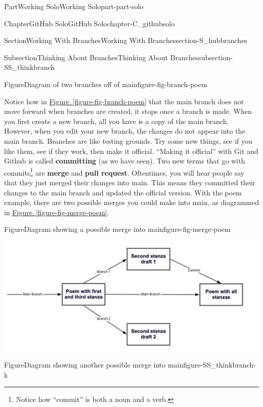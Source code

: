 \documentclass[oneside,10pt,]{book}
\newcommand{\xreffont}{\relax}
\newcommand{\terminology}[1]{\textbf{#1}}
\begin{document}
\begin{partptx}{Part}{Working Solo}{}{Working Solo}{}{}{part-part-solo}
\begin{chapterptx}{Chapter}{GitHub Solo}{}{GitHub Solo}{}{}{chapter-C_githubsolo}
\begin{sectionptx}{Section}{Working With Branches}{}{Working With Branches}{}{}{section-S_hubbranches}
\begin{subsectionptx}{Subsection}{Thinking About Branches}{}{Thinking About Branches}{}{}{subsection-SS_thinkbranch}
\begin{figureptx}{Figure}{Diagram of two branches off of main}{figure-fig-branch-poem}{}
\begin{image}{0}{1}{0}{}
\end{image}%
\tcblower
\end{figureptx}%
 Notice how in \hyperref[figure-fig-branch-poem]{Figure~{\xreffont\ref{figure-fig-branch-poem}}} that the main branch does not move forward when branches are created, it stops once a branch is made. When you first create a new branch, all you have is a copy of the main branch. However, when you edit your new branch, the changes do not appear into the main branch. Branches are like testing grounds. Try some new things, see if you like them, see if they work, then make it official. ``Making it official'' with Git and Github is called \terminology{committing} (as we have seen). Two new terms that go with commits\footnote{Notice how ``commit'' is both a noun and a verb.\label{fn-SS_thinkbranch-i-k}} are \terminology{merge} and \terminology{pull request}. Oftentimes, you will hear people say that they just merged their changes into main. This means they committed their changes to the main branch and updated the official version. With the poem example, there are two possible merges you could make into main, as diagrammed in \hyperref[figure-fig-merge-poem]{Figure~{\xreffont\ref{figure-fig-merge-poem}}}.%
\begin{figureptx}{Figure}{Diagram showing a possible merge into main}{figure-fig-merge-poem}{}%
\begin{image}{0.05}{0.9}{0.05}{}%
\includegraphics[width=\linewidth]{external/merge_poem1.pdf}
\end{image}%
\tcblower
\end{figureptx}%
\begin{figureptx}{Figure}{Diagram showing another possible merge into main}{figure-SS_thinkbranch-k}{}%
\begin{image}{0.05}{0.9}{0.05}{}%

\end{image}
\end{figureptx}
\end{subsectionptx}
\end{sectionptx}
\end{chapterptx}
\end{partptx}
\end{document}
